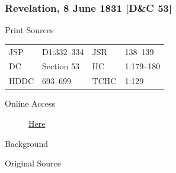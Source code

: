 		\subsubsection{Revelation, 8 June 1831 [D\&C 53]}
			\label{EMS-1831-JS-8-JUN-1831}
		
			\begin{description}
				\item[Print Sources]
			\end{description}

				\begin{tabular}{p{0.5in}p{1in}p{0.5in}p{1in}}
				JSP	 	& D1:332--334	& JSR 		& 138--139 \\
				DC	 	& Section 53 	& HC 		& 1:179--180 \\
				HDDC 	& 693--699		& TCHC 		& 1:129 \\
				\end{tabular}
			
			\begin{description}
				\item[Online Access] \href{https://www.josephsmithpapers.org/paper-summary/revelation-8-june-1831-dc-53/1}{Here}
			\end{description}
			
			\begin{description}
				\item[Background]
			\end{description}
			
			
			\begin{description}
				\item[Original Source]
			\end{description}
			
			
